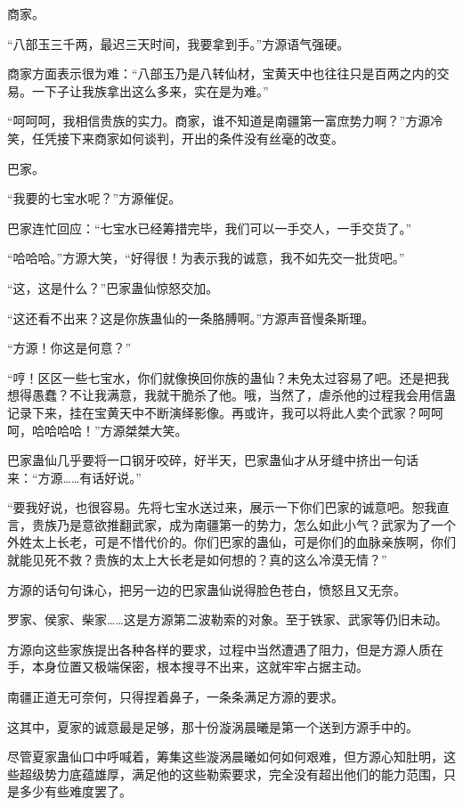 
\begin{this_body}

商家。

“八部玉三千两，最迟三天时间，我要拿到手。”方源语气强硬。

商家方面表示很为难：“八部玉乃是八转仙材，宝黄天中也往往只是百两之内的交易。一下子让我族拿出这么多来，实在是为难。”

“呵呵呵，我相信贵族的实力。商家，谁不知道是南疆第一富庶势力啊？”方源冷笑，任凭接下来商家如何谈判，开出的条件没有丝毫的改变。

巴家。

“我要的七宝水呢？”方源催促。

巴家连忙回应：“七宝水已经筹措完毕，我们可以一手交人，一手交货了。”

“哈哈哈。”方源大笑，“好得很！为表示我的诚意，我不如先交一批货吧。”

“这，这是什么？”巴家蛊仙惊怒交加。

“这还看不出来？这是你族蛊仙的一条胳膊啊。”方源声音慢条斯理。

“方源！你这是何意？”

“哼！区区一些七宝水，你们就像换回你族的蛊仙？未免太过容易了吧。还是把我想得愚蠢？不让我满意，我就干脆杀了他。哦，当然了，虐杀他的过程我会用信蛊记录下来，挂在宝黄天中不断演绎影像。再或许，我可以将此人卖个武家？呵呵呵，哈哈哈哈！”方源桀桀大笑。

巴家蛊仙几乎要将一口钢牙咬碎，好半天，巴家蛊仙才从牙缝中挤出一句话来：“方源……有话好说。”

“要我好说，也很容易。先将七宝水送过来，展示一下你们巴家的诚意吧。恕我直言，贵族乃是意欲推翻武家，成为南疆第一的势力，怎么如此小气？武家为了一个外姓太上长老，可是不惜代价的。你们巴家的蛊仙，可是你们的血脉亲族啊，你们就能见死不救？贵族的太上大长老是如何想的？真的这么冷漠无情？”

方源的话句句诛心，把另一边的巴家蛊仙说得脸色苍白，愤怒且又无奈。

罗家、侯家、柴家……这是方源第二波勒索的对象。至于铁家、武家等仍旧未动。

方源向这些家族提出各种各样的要求，过程中当然遭遇了阻力，但是方源人质在手，本身位置又极端保密，根本搜寻不出来，这就牢牢占据主动。

南疆正道无可奈何，只得捏着鼻子，一条条满足方源的要求。

这其中，夏家的诚意最是足够，那十份漩涡晨曦是第一个送到方源手中的。

尽管夏家蛊仙口中呼喊着，筹集这些漩涡晨曦如何如何艰难，但方源心知肚明，这些超级势力底蕴雄厚，满足他的这些勒索要求，完全没有超出他们的能力范围，只是多少有些难度罢了。


\end{this_body}
